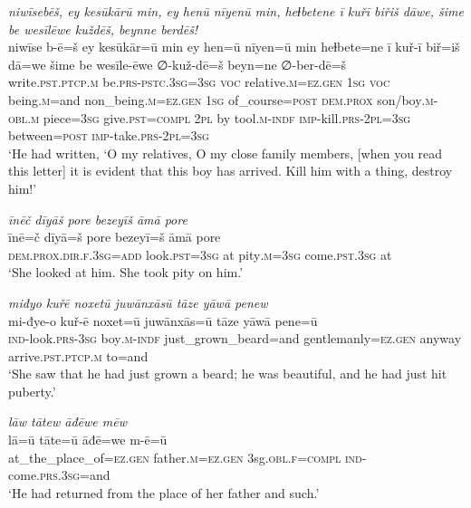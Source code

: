 \ea \label{KŠ.72}
\textit{niwīsebēš, ey kesūkārū min, ey henū nīyenū min, heɫbetene ī kuřī biřiš dāwe, šime be wesīlēwe kuždēš, beynne berdēš!} \\ 
\gll niwīse b-ē=š ey kesūkār=ū min ey hen=ū nīyen=ū min heɫbete=ne ī kuř-ī biř=iš dā=we šime be wesīle-ēwe ∅-kuž-dē=š beyn=ne ∅-ber-dē=š \\ 
 write\textsc{.pst}\textsc{.ptcp}\textsc{.m} be\textsc{.prs}\textsc{-pstc}\textsc{.3sg}\textsc{=3sg} \textsc{voc} relative\textsc{.m}\textsc{\textsc{=ez.gen}} \textsc{1sg} \textsc{voc} being\textsc{.m}=and non\_being\textsc{.m}\textsc{\textsc{=ez.gen}} \textsc{1sg} of\_course\textsc{=\textsc{post}} \textsc{dem.prox} son/boy\textsc{.m}\textsc{-obl}\textsc{.m} piece\textsc{=3sg} give\textsc{.pst}\textsc{=compl} \textsc{2pl} by tool\textsc{.m}\textsc{-indf} \textsc{imp-}kill\textsc{.prs}-\textsc{2pl}\textsc{=3sg} between\textsc{=\textsc{post}} \textsc{imp-}take\textsc{.prs}-\textsc{2pl}\textsc{=3sg} \\ 
\glt `He had written, ‘O my relatives, O my close family members, [when you read this letter] it is evident that this boy has arrived. Kill him with a thing, destroy him!'
\z 
 
\ea \label{KŠ.73}
\textit{īnēč dīyāš pore bezeyīš āmā pore} \\ 
\gll īnē=č dīyā=š pore bezeyī=š āmā pore \\ 
 \textsc{dem.prox}\textsc{.dir}\textsc{.f}\textsc{.3sg}\textsc{=add} look\textsc{.pst}\textsc{=3sg} at pity\textsc{.m}\textsc{=3sg} come\textsc{.pst}\textsc{.3sg} at \\ 
\glt `She looked at him. She took pity on him.'
\z 
 
\ea \label{KŠ.74}
\textit{miđyo kuřē noxetū juwānxāsū tāze yāwā penew} \\ 
\gll mi-đye-o kuř-ē noxet=ū juwānxās=ū tāze yāwā pene=ū \\ 
 \textsc{ind-}look\textsc{.prs}\textsc{-3sg} boy\textsc{.m}\textsc{-indf} just\_grown\_beard=and gentlemanly\textsc{\textsc{=ez.gen}} anyway arrive\textsc{.pst}\textsc{.ptcp}\textsc{.m} to=and \\ 
\glt `She saw that he had just grown a beard; he was beautiful, and he had just hit puberty.'
\z 
 
\ea \label{KŠ.75}
\textit{lāw tātew āđēwe mēw} \\ 
\gll lā=ū tāte=ū āđē=we m-ē=ū \\ 
 at\_the\_place\_of\textsc{\textsc{=ez.gen}} father\textsc{.m}\textsc{\textsc{=ez.gen}} 3sg\textsc{.obl}\textsc{.f}\textsc{=compl} \textsc{ind-}come\textsc{.prs}\textsc{.3sg}=and \\ 
\glt `He had returned from the place of her father and such.'
\z 
 
